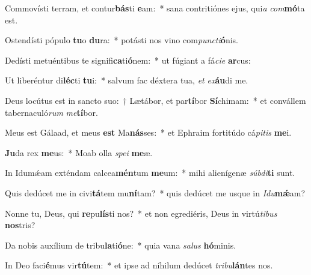 \item Commovísti terram, et contur\textbf{bás}ti \textbf{e}am:~* sana contritiónes ejus, qui\textit{a} \textit{com}\textbf{mó}ta est.
\item Ostendísti pópulo \textbf{tu}o \textbf{du}ra:~* potásti nos vino com\textit{punc}\textit{ti}\textbf{ó}nis.
\item Dedísti metuéntibus te signifi\textbf{ca}ti\textbf{ó}nem:~* ut fúgiant a fá\textit{ci}\textit{e} \textbf{ar}cus:
\item Ut liberéntur di\textbf{léc}ti \textbf{tu}i:~* salvum fac déxtera tua, \textit{et} \textit{ex}\textbf{áu}di me.
\item Deus locútus est in sancto suo:~† Lætábor, et par\textbf{tí}bor \textbf{Sí}chimam:~* et convállem tabernaculó\textit{rum} \textit{me}\textbf{tí}bor.
\item Meus est Gálaad, et meus \textbf{est} Ma\textbf{nás}ses:~* et Ephraim fortitúdo cá\textit{pi}\textit{tis} \textbf{me}i.
\item \textbf{Ju}da rex \textbf{me}us:~* Moab olla \textit{spe}\textit{i} \textbf{me}æ.
\item In Idumǽam exténdam calcea\textbf{mén}tum \textbf{me}um:~* mihi alienígenæ \textit{súb}\textit{di}\textbf{ti} sunt.
\item Quis dedúcet me in civi\textbf{tá}tem mu\textbf{ní}tam?~* quis dedúcet me usque in \textit{I}\textit{du}\textbf{mǽ}am?
\item Nonne tu, Deus, qui \textbf{re}pu\textbf{lís}ti nos?~* et non egrediéris, Deus in virtú\textit{ti}\textit{bus} \textbf{nos}tris?
\item Da nobis auxílium de tribu\textbf{la}ti\textbf{ó}ne:~* quia vana \textit{sa}\textit{lus} \textbf{hó}minis.
\item In Deo faci\textbf{é}mus vir\textbf{tú}tem:~* et ipse ad níhilum dedúcet \textit{tri}\textit{bu}\textbf{lán}tes nos.
